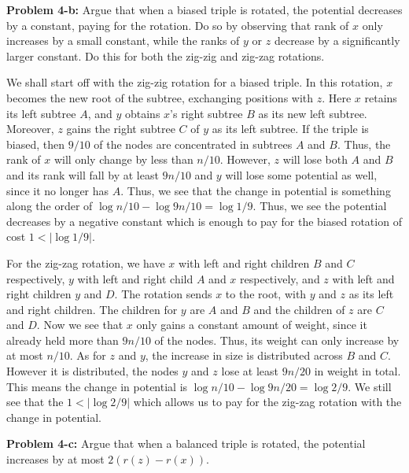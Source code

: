 \documentclass[psamsfonts]{amsart}
\newenvironment{sol}{\vspace{0.25cm}{\large \bfseries Solution:}}{\qedsymbol}
\newenvironment{prob}[1]{\begin{framed}{\large \bfseries Problem #1:}}{\end{framed}}
\begin{document}
\begin{prob}{4-b}
Argue that when a biased triple is rotated, the potential decreases by a constant, paying for the rotation. Do so by observing that rank of $x$ only increases by a small constant, while the ranks of $y$ or $z$ decrease by a significantly larger constant. Do this for both the zig-zig and zig-zag rotations.
\end{prob}
\begin{sol}
We shall start off with the zig-zig rotation for a biased triple. In this rotation, $x$ becomes the new root of the subtree, exchanging positions with $z$. Here $x$ retains its left subtree $A$, and $y$ obtains $x$'s right subtree $B$ as its new left subtree. Moreover, $z$ gains the right subtree $C$ of $y$ as its left subtree. If the triple is biased, then $9/10$ of the nodes are concentrated in subtrees $A$ and $B$. Thus, the rank of $x$ will only change by less than $n/10$. However, $z$ will lose both $A$ and $B$ and its rank will fall by at least $9n/10$ and $y$ will lose some potential as well, since it no longer has $A$. Thus, we see that the change in potential is something along the order of $\log n/10 - \log 9n/10 = \log 1/9$. Thus, we see the potential decreases by a negative constant which is enough to pay for the biased rotation of cost $1 < | \log 1/9 |$. 

For the zig-zag rotation, we have $x$ with left and right children $B$ and $C$ respectively, $y$ with left and right child $A$ and $x$ respectively, and $z$ with left and right children $y$ and $D$. The rotation sends $x$ to the root, with $y$ and $z$ as its left and right children. The children for $y$ are $A$ and $B$ and the children of $z$ are $C$ and $D$. Now we see that $x$ only gains a constant amount of weight, since it already held more than $9n/10$ of the nodes. Thus, its weight can only increase by at most $n/10$. As for $z$ and $y$, the increase in size is distributed across $B$ and $C$. However it is distributed, the nodes $y$ and $z$ lose at least $9n/20$ in weight in total. This means the change in potential is $\log n/10 - \log 9n/20 = \log 2/9$. We still see that the $1 < |\log 2/9|$ which allows us to pay for the zig-zag rotation with the change in potential.
\end{sol}

\begin{prob}{4-c}
Argue that when a balanced triple is rotated, the potential increases by at most $2(r(z) - r(x))$.
\end{prob}
\end{document}
